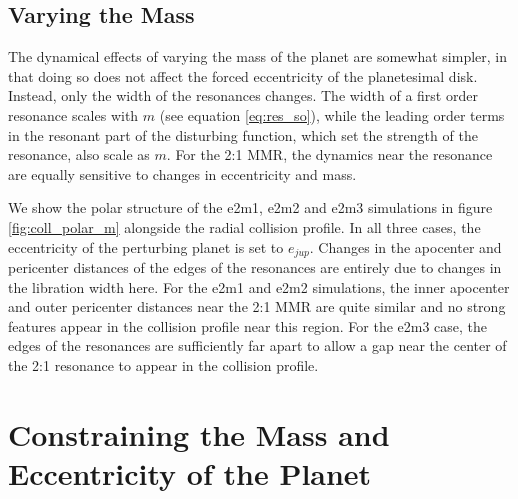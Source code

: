 \documentclass[twocolumn]{aastex63}
\begin{document}
\subsection{Varying the Mass}

The dynamical effects of varying the mass of the planet are somewhat simpler, in that doing so does not affect the forced eccentricity of the 
planetesimal disk. Instead, only the width of the resonances changes. The width of a first order resonance scales with $m$ (see equation 
\ref{eq:res_so}), while the leading order terms in the resonant part of the disturbing function, which set the strength of the resonance, also scale as 
$m$. For the 2:1 MMR, the dynamics near the resonance are equally sensitive to changes in eccentricity and mass.

We show the polar structure of the e2m1, e2m2 and e2m3 simulations in figure \ref{fig:coll_polar_m} alongside the radial collision profile. In all three 
cases, the eccentricity of the perturbing planet is set to $e_{jup}$. Changes in the apocenter and pericenter distances of the edges of the 
resonances are entirely due to changes in the libration width here. For the e2m1 and e2m2 simulations, the inner apocenter and outer pericenter 
distances near the 2:1 MMR are quite similar and no strong features appear in the collision profile near this region. For the e2m3 case, the edges of 
the resonances are sufficiently far apart to allow a gap near the center of the 2:1 resonance to appear in the collision profile.

\section{Constraining the Mass and Eccentricity of the Planet}\label{sec:constrain}
\end{document}
